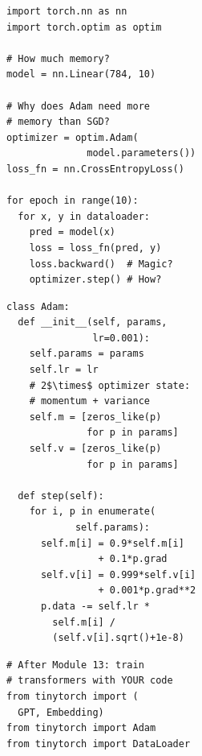 \documentclass[10pt,twocolumn]{article}
\begin{document}
\begin{figure}[t]
\centering
\hfill
\begin{minipage}[b]{0.32\textwidth}
\begin{subfigure}[b]{\textwidth}
\centering
\begin{lstlisting}[basicstyle=\fontsize{6}{7}\selectfont\ttfamily,frame=single,style=pythonstyle]
import torch.nn as nn
import torch.optim as optim

# How much memory?
model = nn.Linear(784, 10)

# Why does Adam need more
# memory than SGD?
optimizer = optim.Adam(
              model.parameters())
loss_fn = nn.CrossEntropyLoss()

for epoch in range(10):
  for x, y in dataloader:
    pred = model(x)
    loss = loss_fn(pred, y)
    loss.backward()  # Magic?
    optimizer.step() # How?
\end{lstlisting}
\vspace{0.15em}
\label{lst:pytorch-usage}
\end{subfigure}
\end{minipage}
\hfill
\begin{minipage}[b]{0.31\textwidth}
\begin{subfigure}[b]{\textwidth}
\centering
\begin{lstlisting}[basicstyle=\fontsize{6}{7}\selectfont\ttfamily,frame=single,style=pythonstyle]
class Adam:
  def __init__(self, params,
               lr=0.001):
    self.params = params
    self.lr = lr
    # 2$\times$ optimizer state:
    # momentum + variance
    self.m = [zeros_like(p)
              for p in params]
    self.v = [zeros_like(p)
              for p in params]

  def step(self):
    for i, p in enumerate(
            self.params):
      self.m[i] = 0.9*self.m[i]
                + 0.1*p.grad
      self.v[i] = 0.999*self.v[i]
                + 0.001*p.grad**2
      p.data -= self.lr *
        self.m[i] /
        (self.v[i].sqrt()+1e-8)
\end{lstlisting}
\vspace{0.15em}
\label{lst:tinytorch-build}
\end{subfigure}
\end{minipage}
\hfill
\begin{minipage}[b]{0.3\textwidth}
\begin{subfigure}[b]{\textwidth}
\centering
\begin{lstlisting}[basicstyle=\fontsize{6}{7}\selectfont\ttfamily,frame=single,style=pythonstyle]
# After Module 13: train
# transformers with YOUR code
from tinytorch import (
  GPT, Embedding)
from tinytorch import Adam
from tinytorch import DataLoader


\end{lstlisting}
\end{subfigure}
\end{minipage}
\end{figure}
\end{document}
